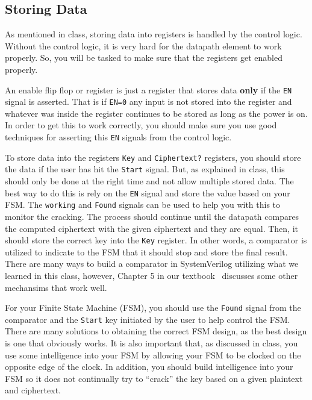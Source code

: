 \documentclass{article}
\begin{document}
\subsection{Storing Data}

As mentioned in class, storing data into registers is handled by the
control logic.  Without the control logic, it is very hard for the
datapath element to work properly.  So, you will be tasked to make
sure that the registers get enabled properly.

An enable flip flop or register is just a register that stores data
\textbf{only} if the \verb!EN! signal is asserted.  That is if
\verb!EN=0! any input is not stored into the register and whatever was
inside the register continues to be stored as long as the power is
on.  In order to get this to work correctly, you should make sure you
use good techniques for asserting this \verb!EN! signals from the
control logic.

To store data into the registers \verb!Key! and \verb!Ciphertext?!
registers,
you should store the data if the user has hit the \verb!Start! signal.
But, as explained in class, this should only be done at the right time
and not allow multiple stored data.  The best way to do this is rely
on the \verb!EN! signal and store the value based on your FSM.  The
\verb!working! and \verb!Found! signals
can be used to help you with this to monitor the cracking.  The
process should continue until the datapath compares the computed
ciphertext with the given ciphertext and they are equal.  Then, it
should store the correct key into the \verb!Key! register.  In other
words, a comparator is utilized to indicate to the FSM that it should
stop and store the final result.  There are many ways to build a
comparator in SystemVerilog utilizing what we learned in this class,
however, Chapter 5 in our
textbook~\cite{10.5555/2815529} discusses some other mechansims that
work well.  

For your Finite State Machine (FSM), you should use the \verb!Found!
signal from the comparator
and the \verb!Start! key initiated by the user
to help control the FSM.  There are many
solutions to obtaining the correct FSM design, as the best design is
one that obviously works.  It is also important that, as discussed in
class, you
use some intelligence into your FSM by allowing your FSM to be clocked
on the opposite edge of the clock.  In addition, you should build
intelligence into your FSM so it does not continually try to ``crack''
the key based on a given plaintext and ciphertext.
\end{document}
